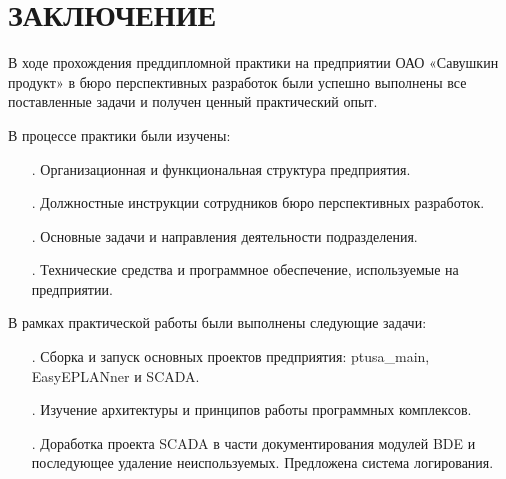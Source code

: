 \sectionbreak \section*{
	\gostTitleFont
	\redline
	ЗАКЛЮЧЕНИЕ
}

\subtitlespace

{\gostFont

	\par \redline В ходе прохождения преддипломной практики на предприятии ОАО «Савушкин продукт» в бюро перспективных разработок были успешно выполнены все поставленные задачи и получен ценный практический опыт.

	\par \redline В процессе практики были изучены:
	\begin{itemize}[leftmargin=2.15cm, labelwidth=0.65cm, labelsep=0.0cm] 

		\item[\theitemcntr.] Организационная и функциональная структура предприятия.
		\addtocounter{itemcntr}{1}

		\item[\theitemcntr.] Должностные инструкции сотрудников бюро перспективных разработок.
		\addtocounter{itemcntr}{1}

		\item[\theitemcntr.] Основные задачи и направления деятельности подразделения.
		\addtocounter{itemcntr}{1}

		\item[\theitemcntr.] Технические средства и программное обеспечение, используемые на предприятии.
		\addtocounter{itemcntr}{1}

		\setcounter{itemcntr}{1}
		\end{itemize}

		\par \redline В рамках практической работы были выполнены следующие задачи:
		\begin{itemize}[leftmargin=2.15cm, labelwidth=0.65cm, labelsep=0.0cm] 

		\item[\theitemcntr.] Сборка и запуск основных проектов предприятия: ptusa\_main, EasyEPLANner и SCADA.
		\addtocounter{itemcntr}{1}

		\item[\theitemcntr.] Изучение архитектуры и принципов работы программных комплексов.
		\addtocounter{itemcntr}{1}

		\item[\theitemcntr.] Доработка проекта SCADA в части документирования модулей BDE и последующее удаление неиспользуемых. Предложена система логирования.
		\addtocounter{itemcntr}{1}


\end{itemize}}
